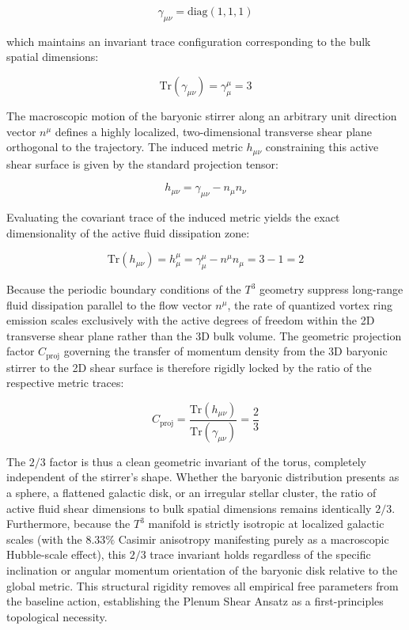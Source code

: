 \documentclass[aps,prd,10pt,twocolumn,superscriptaddress,nofootinbib,floatfix]{revtex4-2}
\begin{document}
\begin{equation}
\gamma_{\mu\nu} = \text{diag}(1, 1, 1)
\end{equation}

which maintains an invariant trace configuration corresponding to the bulk spatial dimensions:

\begin{equation}
\text{Tr}(\gamma_{\mu\nu}) = \gamma^\mu_\mu = 3
\end{equation}

The macroscopic motion of the baryonic stirrer along an arbitrary unit direction vector $n^\mu$ defines a highly localized, two-dimensional transverse shear plane orthogonal to the trajectory. The induced metric $h_{\mu\nu}$ constraining this active shear surface is given by the standard projection tensor:

\begin{equation}
h_{\mu\nu} = \gamma_{\mu\nu} - n_{\mu}n_{\nu}
\end{equation}

Evaluating the covariant trace of the induced metric yields the exact dimensionality of the active fluid dissipation zone:

\begin{equation}
\text{Tr}(h_{\mu\nu}) = h^\mu_\mu = \gamma^\mu_\mu - n^\mu n_\mu = 3 - 1 = 2
\end{equation}

Because the periodic boundary conditions of the $T^3$ geometry suppress long-range fluid dissipation parallel to the flow vector $n^\mu$, the rate of quantized vortex ring emission scales exclusively with the active degrees of freedom within the 2D transverse shear plane rather than the 3D bulk volume. The geometric projection factor $C_{\text{proj}}$ governing the transfer of momentum density from the 3D baryonic stirrer to the 2D shear surface is therefore rigidly locked by the ratio of the respective metric traces:

\begin{equation}
C_{\text{proj}} = \frac{\text{Tr}(h_{\mu\nu})}{\text{Tr}(\gamma_{\mu\nu})} = \frac{2}{3}
\end{equation}

The $2/3$ factor is thus a clean geometric invariant of the torus, completely independent of the stirrer's shape. Whether the baryonic distribution presents as a sphere, a flattened galactic disk, or an irregular stellar cluster, the ratio of active fluid shear dimensions to bulk spatial dimensions remains identically $2/3$. Furthermore, because the $T^3$ manifold is strictly isotropic at localized galactic scales (with the $8.33\%$ Casimir anisotropy manifesting purely as a macroscopic Hubble-scale effect), this $2/3$ trace invariant holds regardless of the specific inclination or angular momentum orientation of the baryonic disk relative to the global metric. This structural rigidity removes all empirical free parameters from the baseline action, establishing the Plenum Shear Ansatz as a first-principles topological necessity.
\end{document}
